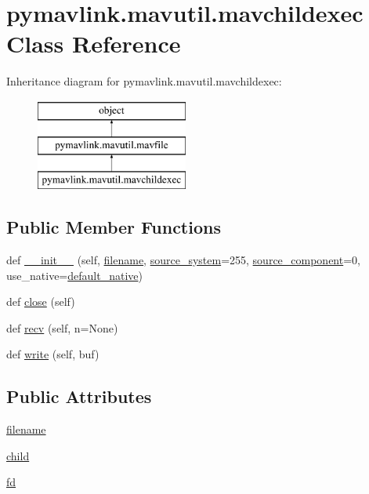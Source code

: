 \hypertarget{classpymavlink_1_1mavutil_1_1mavchildexec}{}\section{pymavlink.\+mavutil.\+mavchildexec Class Reference}
\label{classpymavlink_1_1mavutil_1_1mavchildexec}
Inheritance diagram for pymavlink.\+mavutil.\+mavchildexec\+:\begin{figure}[H]
\begin{center}
\leavevmode
\includegraphics[height=3.000000cm]{classpymavlink_1_1mavutil_1_1mavchildexec}
\end{center}
\end{figure}
\subsection*{Public Member Functions}
\begin{DoxyCompactItemize}
\item 
def \mbox{\hyperlink{classpymavlink_1_1mavutil_1_1mavchildexec_a22c046b50111af6b46e66e3db0dc200f}{\+\_\+\+\_\+init\+\_\+\+\_\+}} (self, \mbox{\hyperlink{classpymavlink_1_1mavutil_1_1mavchildexec_ae0133d930cc07cfd3044acd79467ad39}{filename}}, \mbox{\hyperlink{classpymavlink_1_1mavutil_1_1mavfile_a02c06667c79f4414ed9c4ee6a8dec903}{source\+\_\+system}}=255, \mbox{\hyperlink{classpymavlink_1_1mavutil_1_1mavfile_a84e307f771a9ac2aed567831845c417e}{source\+\_\+component}}=0, use\+\_\+native=\mbox{\hyperlink{namespacepymavlink_1_1mavutil_a21ce9da7b698a7bc21c44b9f77341b62}{default\+\_\+native}})
\item 
def \mbox{\hyperlink{classpymavlink_1_1mavutil_1_1mavchildexec_ae42ec30dccc050e0b632847b4d47934a}{close}} (self)
\item 
def \mbox{\hyperlink{classpymavlink_1_1mavutil_1_1mavchildexec_a82bdf3a8047fb35d535a82fd85761a52}{recv}} (self, n=None)
\item 
def \mbox{\hyperlink{classpymavlink_1_1mavutil_1_1mavchildexec_af5ffc52892313980ff86884f05b3741a}{write}} (self, buf)
\end{DoxyCompactItemize}
\subsection*{Public Attributes}
\begin{DoxyCompactItemize}
\item 
\mbox{\hyperlink{classpymavlink_1_1mavutil_1_1mavchildexec_ae0133d930cc07cfd3044acd79467ad39}{filename}}
\item 
\mbox{\hyperlink{classpymavlink_1_1mavutil_1_1mavchildexec_a9ef348cfba7512397dc40271ad168cdf}{child}}
\item 
\mbox{\hyperlink{classpymavlink_1_1mavutil_1_1mavchildexec_a039de5bba86d9d52c421e2763258e720}{fd}}
\end{DoxyCompactItemize}


